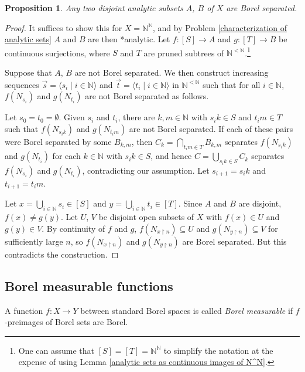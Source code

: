 \documentclass[10pt]{amsart}
\newcommand{\NN}{\mathbb{N}}
\newtheorem{proposition}[theorem]{Proposition}
\theoremstyle{definition}
\theoremstyle{remark}
\begin{document}
\begin{proposition} \label{separation of analytic sets} 
Any two disjoint analytic subsets $A$, $B$ of $X$ are Borel separated. 
\end{proposition} 
\begin{proof} 
It suffices to show this for $X=\NN^\NN$, and by Problem \ref{characterization of analytic sets} $A$ and $B$ are then *analytic. 
Let $f\colon [S]\rightarrow A$ and $g\colon [T]\rightarrow B$ be continuous surjections, where $S$ and $T$ are pruned subtrees of $\NN^{<\NN}$.\footnote{One can assume that $[S]=[T]=\NN^\NN$ to simplify the notation at the expense of using Lemma \ref{analytic sets as continuous images of N^N}. } 

Suppose that $A$, $B$ are not Borel separated. 
We then construct increasing sequences $\vec{s}=\langle s_i\mid i\in\NN\rangle$ and $\vec{t}=\langle t_i\mid i\in\NN\rangle$ in $\NN^{<\NN}$ such that for all $i\in\NN$, $f(N_{s_i})$ and $g(N_{t_i})$ are not Borel separated as follows. 

Let $s_0=t_0=\emptyset$. 
Given $s_i$ and $t_i$, there are $k,m\in \NN$ with $s_i k\in S$ and $t_i m\in T$ such that $f(N_{s_i k})$ and $g(N_{t_i m})$ are not Borel separated. 
If each of these pairs were Borel separated by some $B_{k,m}$, then $C_k=\bigcap_{t_i m\in T} B_{k,m}$ separates $f(N_{s_i k})$ and $g(N_{t_i})$ for each $k\in\NN$ with $s_i k\in S$, and hence $C=\bigcup_{s_i k\in S} C_k$ separates $f(N_{s_i})$ and $g(N_{t_i})$, contradicting our assumption. 
Let $s_{i+1}=s_i k$ and $t_{i+1}= t_i m$. 

Let $x=\bigcup_{i\in\NN} s_i\in [S]$ and $y=\bigcup_{i\in\NN} t_i\in [T]$. 
Since $A$ and $B$ are disjoint, $f(x)\neq g(y)$. 
Let $U$, $V$ be disjoint open subsets of $X$ with $f(x)\in U$ and $g(y)\in V$. 
By continuity of $f$ and $g$, $f(N_{x{\upharpoonright}n})\subseteq U$ and $g(N_{y{\upharpoonright}n})\subseteq V$ for sufficiently large $n$, so $f(N_{x{\upharpoonright}n})$ and $g(N_{y{\upharpoonright}n})$ are Borel separated. 
But this contradicts the construction. 
\end{proof} 




\subsection{Borel measurable functions} 

A function $f\colon X\rightarrow Y$ between standard Borel spaces is called \emph{Borel measurable} if $f$-preimages of Borel sets are Borel. 
\end{document}
